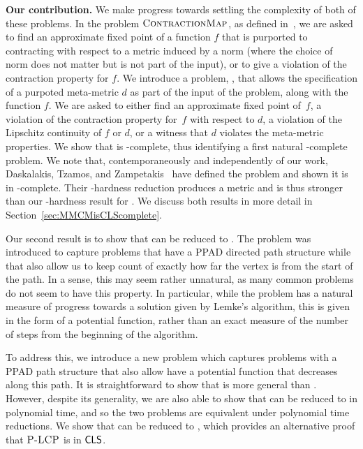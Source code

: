 \noindent
\textbf{Our contribution.}
We make progress towards settling the complexity of both of these problems. In
the problem $\textsc{ContractionMap}$, as defined in~\cite{daskalakis2011continuous}, we
are asked to find an approximate fixed point of a function $f$ that is purported
to contracting with respect to a metric induced by a norm (where the choice of
norm does not matter but is not part of the input), or to give a violation of
the contraction property for $f$. We introduce a problem, \MMCM, that allows
the specification of a purpoted meta-metric $d$ as part of the input of the problem,
along with the function $f$. We are asked to either find an approximate fixed
point of~$f$, a violation of the contraction property for~$f$ with respect to
$d$, a violation of the Lipschitz continuity of $f$ or $d$, or a witness that $d$ violates 
the meta-metric properties.
We show that \MMCM is \CLS-complete, thus identifying a first natural \CLS-complete problem.
We note that, contemporaneously and independently of our work, Daskalakis, Tzamos, and
Zampetakis~\cite{DTZ17} have defined the problem \MBanach and shown it is in \CLS-complete.
Their \CLS-hardness reduction produces a metric and 
is thus stronger than our \CLS-hardness result for \MMCM. 
We discuss both results in more detail in Section~\ref{sec:MMCMisCLScomplete}.

Our second result is to show that \PLCP can be reduced to \EOML.
The \EOML problem was introduced to capture problems that have a PPAD directed
path structure while that also allow us to keep count of exactly how far the vertex is from
the start of the path. In a sense, this may seem rather unnatural, as many common
problems do not seem to have this property. In particular, while the \PLCP problem
has a natural measure of progress towards a solution given by Lemke's algorithm, 
this is given in the form of a potential function, rather than an exact measure
of the number of steps from the beginning of the algorithm.

To address this, we introduce a new problem \EOPL which captures problems with a
PPAD path structure that also allow have a potential function that decreases
along this path. It is straightforward to show that \EOPL is more general than
\EOML. However, despite its generality, we are also able to show that \EOPL can
be reduced to \EOML in polynomial time, and so the two problems are equivalent
under polynomial time reductions.  We show that \PLCP can be reduced to \EOPL,
which provides an alternative proof that $\textsc{P-LCP}$ is in $\mathsf{CLS}$.

